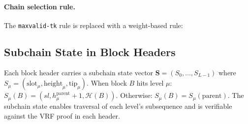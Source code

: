\documentclass[11pt]{article}
\newcommand{\hash}{\mathcal{H}}
\begin{document}
\paragraph{Chain selection rule.} The \texttt{maxvalid-tk} rule is replaced with a weight-based rule:

\medskip
\noindent{}
\medskip

\subsection{Subchain State in Block Headers}

Each block header carries a subchain state vector $\mathbf{S} = (S_0, \ldots, S_{L-1})$ where $S_\mu = (\text{slot}_\mu, \text{height}_\mu, \text{tip}_\mu)$. When block $B$ hits level $\mu$: $S_\mu(B) = (sl, h_\mu^{\text{parent}} + 1, \hash(B))$. Otherwise: $S_\mu(B) = S_\mu(\text{parent})$. The subchain state enables traversal of each level's subsequence and is verifiable against the VRF proof in each header.

\end{document}
